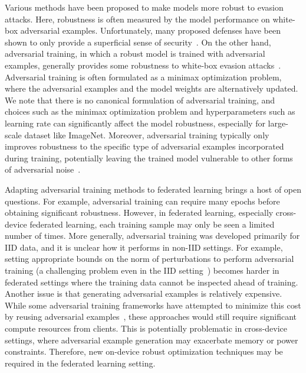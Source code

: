 \documentclass[11pt]{article}
\begin{document}
Various methods have been proposed to make models more robust to evasion attacks. Here, robustness is often measured by the model performance on white-box adversarial examples.
Unfortunately, many proposed defenses have been shown to only provide a superficial sense of security~\cite{athalye2018obfuscated}.  
On the other hand, adversarial training, in which a robust model is trained with adversarial examples, generally provides some robustness to white-box evasion attacks~\cite{madry2017towards, xie2018feature, shafahi2018free}.
Adversarial training is often formulated as a minimax optimization problem, where the adversarial examples and the model weights are alternatively updated. We note that there is no canonical formulation of adversarial training, and choices such as the minimax optimization problem and hyperparameters such as learning rate can significantly affect the model robustness, especially for large-scale dataset like ImageNet. Moreover, adversarial training typically only improves robustness to the specific type of adversarial examples incorporated during training, potentially leaving the trained model vulnerable to other forms of adversarial noise~\cite{engstrom2017rotation, tramer2019adversarial, sharma2017attacking}.

Adapting adversarial training methods to federated learning brings a host of open questions. For example, adversarial training can require many epochs before obtaining significant robustness. However, in federated learning, especially cross-device federated learning, each training sample may only be seen a limited number of times. More generally, adversarial training was developed primarily for IID data, and it is unclear how it performs in non-IID settings. For example, setting appropriate bounds on the norm of perturbations to perform adversarial training (a challenging problem even in the IID setting~\cite{DBLP:conf/icml/TramerBCPJ20}) becomes harder in federated settings where the training data cannot be inspected ahead of training.
Another issue is that generating adversarial examples is relatively expensive. While some adversarial training frameworks have attempted to minimize this cost by reusing adversarial examples~\cite{shafahi2018free}, these approaches would still require significant compute resources from clients. This is potentially problematic in cross-device settings, where adversarial example generation may exacerbate memory or power constraints. Therefore, new on-device robust optimization techniques may be required in the federated learning setting. 
\end{document}
